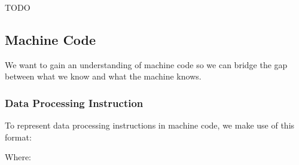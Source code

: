 \documentclass[letterpaper]{article}
\begin{document}
TODO

\subsection{Machine Code}
We want to gain an understanding of machine code so we can bridge the gap between what we know and what the machine knows.

\subsubsection{Data Processing Instruction}
To represent data processing instructions in machine code, we make use of this format:
\begin{center}
\end{center}
Where:
\end{document}
